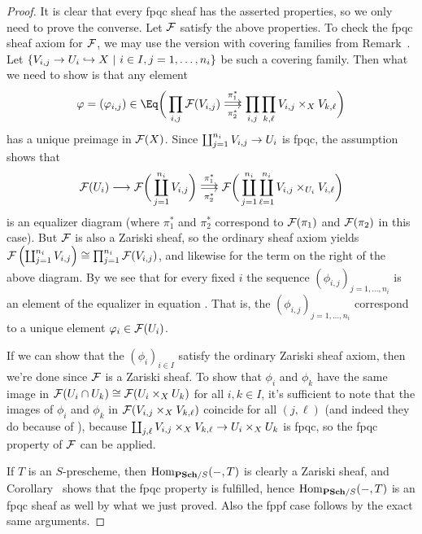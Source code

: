 \documentclass[a4paper,parskip=half,numbers=enddot, DIV=12]{scrreprt}
\begin{document}
\begin{proof}
	It is clear that every fpqc sheaf has the asserted properties, so we only need to prove the converse. Let $\mathcal{F}$ satisfy the above properties. To check the fpqc sheaf axiom for $\mathcal{F}$, we may use the version with covering families from Remark~. Let $\left\{V_{i,j}\morphism U_i\monomorphism X\st i\in I, j=1,\ldots, n_i\right\}$ be such a covering family. Then what we need to show is that any element
	\begin{align}\lbl{eq:phiEq1}
		\phi=(\phi_{i,j})\in\Eq\bigg(\prod_{i,j}\Ff(V_{i,j})\doublemorphism[\pi_1^*][\pi_2^*]\prod_{i,j}\prod_{k,\ell}V_{i,j}\times_XV_{k,\ell}\bigg)
	\end{align}
	has a unique preimage in $\mathcal{F}(X)$. Since $\coprod_{j=1}^{n_i}V_{i,j}\morphism U_i$ is fpqc, the assumption shows that 
	\begin{align}\lbl{eq:phiEq2}
		\Ff(U_i)\morphism\Ff\bigg(\coprod_{j=1}^{n_i}V_{i,j}\bigg)\doublemorphism[\pi_1^*][\pi_2^*]\Ff\bigg(\coprod_{j=1}^{n_i}\coprod_{\ell=1}^{n_i}V_{i,j}\times_{U_i}V_{i,\ell}\bigg)
	\end{align}
	is an equalizer diagram (where $\pi_1^*$ and $\pi_2^*$ correspond to $\mathcal{F}(\pi_1)$ and $\mathcal{F}(\pi_2)$ in this case). But $\mathcal{F}$ is also a Zariski sheaf, so the ordinary sheaf axiom yields $\mathcal{F}\left(\coprod_{j=1}^{n_i}V_{i,j}\right)\cong\prod_{j=1}^{n_i}\mathcal{F}(V_{i,j})$, and likewise for the term on the right of the above diagram. By  we see that for every fixed $i$ the sequence $(\phi_{i,j})_{j=1,\ldots,n_i}$ is an element of the equalizer in equation . That is, the $(\phi_{i,j})_{j=1,\ldots,n_i}$ correspond to a unique element $\varphi_i\in \mathcal{F}(U_i)$.
	
	If we can show that the $(\phi_i)_{i\in I}$ satisfy the ordinary Zariski sheaf axiom, then we're done since $\mathcal{F}$ is a Zariski sheaf. To show that $\phi_i$ and $\phi_k$ have the same image in $\mathcal{F}(U_i\cap U_k)\cong \mathcal{F}(U_i\times_XU_k)$ for all $i,k\in I$, it's sufficient to note that the images of $\phi_i$ and $\phi_k$ in $\mathcal{F}(V_{i,j}\times_XV_{k,\ell})$ coincide for all $(j,\ell)$ (and indeed they do because of ), because $\coprod_{j,\ell}V_{i,j}\times_XV_{k,\ell}\morphism U_i\times_XU_k$ is fpqc, so the fpqc property of $\mathcal{F}$ can be applied.
	
	If $T$ is an $S$-prescheme, then $\Hom_{\cat{PSch}/S}(-,T)$ is clearly a Zariski sheaf, and Corollary~ shows that the fpqc property is fulfilled, hence $\Hom_{\cat{PSch}/S}(-,T)$ is an fpqc sheaf as well by what we just proved. Also the fppf case follows by the exact same arguments.
\end{proof}
\end{document}
